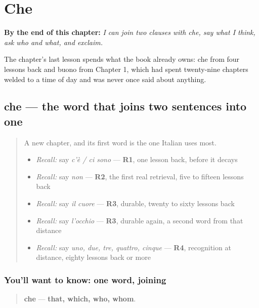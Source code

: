 
\chapter{Che}
\label{ch:it-che}

\begin{chapteropening}
\textbf{By the end of this chapter:} \emph{I can join two clauses with che, say what I think, ask who and what, and exclaim.}

The chapter's last lesson spends what the book already owns: che from four lessons back and buono from Chapter 1, which had spent twenty-nine chapters welded to a time of day and was never once said about anything.
\end{chapteropening}

\section[che]{che — the word that joins two sentences into one}

\label{lesson:IT-C31-che}



\begin{quote}
A new chapter, and its first word is the one Italian uses most.

\begin{itemize}
\raggedright
  \item \emph{Recall:} say \emph{c'è / ci sono} — \textbf{R1}, one lesson back, before it decays
  \item \emph{Recall:} say \emph{non} — \textbf{R2}, the first real retrieval, five to fifteen lessons back
  \item \emph{Recall:} say \emph{il cuore} — \textbf{R3}, durable, twenty to sixty lessons back
  \item \emph{Recall:} say \emph{l'occhio} — \textbf{R3}, durable again, a second word from that distance
  \item \emph{Recall:} say \emph{uno, due, tre, quattro, cinque} — \textbf{R4}, recognition at distance, eighty lessons back or more
\end{itemize}
\end{quote}

\subsection*{You'll want to know: one word, joining}
\begin{quote}
\textbf{che} — \textbf{that, which, who, whom}.
\end{quote}

